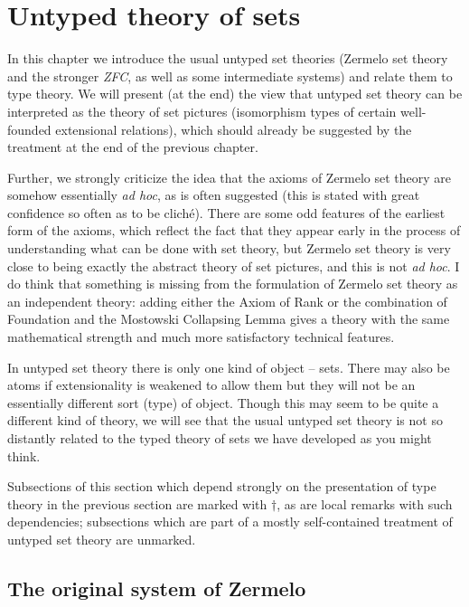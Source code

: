 \documentclass[12pt]{book}
\begin{document}
\newpage

\chapter{Untyped theory of sets}

In this chapter we introduce the usual untyped set theories (Zermelo
set theory and the stronger {\em ZFC\/}, as well as some intermediate systems) and relate them to type
theory.  We will present (at the end) the view that untyped set theory can be
interpreted as the theory of set pictures (isomorphism types of
certain well-founded extensional relations), which should already be
suggested by the treatment at the end of the previous chapter.

Further, we strongly criticize the idea that the axioms of Zermelo set
theory are somehow essentially {\em ad hoc\/}, as is often suggested
(this is stated with great confidence so often as to be clich\'e).
There are some odd features of the earliest form of the axioms, which
reflect the fact that they appear early in the process of
understanding what can be done with set theory, but Zermelo set theory
is very close to being exactly the abstract theory of set pictures,
and this is not {\em ad hoc\/}.  I do think that something is missing from the formulation of
Zermelo set theory as an independent theory:  adding either the Axiom of Rank or the combination of Foundation and the Mostowski Collapsing Lemma gives a theory with the same mathematical strength and much more satisfactory technical features.

In untyped set theory there is only one kind of object -- sets.  There
may also be atoms if extensionality is weakened to allow them but they
will not be an essentially different sort (type) of object.  Though
this may seem to be quite a different kind of theory, we will see that
the usual untyped set theory is not so distantly related to the typed
theory of sets we have developed as you might think.

Subsections of this section which depend strongly on the presentation of type theory in the previous section are marked with $\dagger$, as are local remarks with such dependencies;  subsections which are part of a mostly self-contained treatment of untyped set theory are unmarked.

\newpage

\section{The original system of Zermelo}
\end{document}
